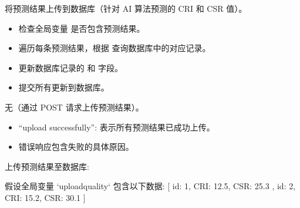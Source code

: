 \documentclass[a4paper,12pt,english]{sphinxmanual}
\begin{document}

\begin{fulllineitems}
\label{\detokenize{api/login:login.uploadQualityResult}}
\pysigstartsignatures
{}
\pysigstopsignatures
\sphinxAtStartPar
将预测结果上传到数据库（针对 AI 算法预测的 CRI 和 CSR 值）。
\begin{description}
\begin{itemize}
\item {} 
\sphinxAtStartPar
检查全局变量  是否包含预测结果。

\item {} 
\sphinxAtStartPar
遍历每条预测结果，根据  查询数据库中的对应记录。

\item {} 
\sphinxAtStartPar
更新数据库记录的  和  字段。

\item {} 
\sphinxAtStartPar
提交所有更新到数据库。

\end{itemize}

\sphinxAtStartPar
无（通过 POST 请求上传预测结果）。

\begin{description}
\begin{itemize}
\item {} 
\sphinxAtStartPar
“upload successfully”: 表示所有预测结果已成功上传。

\item {} 
\sphinxAtStartPar
错误响应包含失败的具体原因。

\end{itemize}

\end{description}

\sphinxAtStartPar
上传预测结果至数据库:

\begin{sphinxVerbatim}[commandchars=\\\{\}]
假设全局变量 `upload\PYGZus{}quality` 包含以下数据:
[
    \PYGZob{}
        \PYGZdq{}id\PYGZdq{}: 1,
        \PYGZdq{}CRI\PYGZdq{}: 12.5,
        \PYGZdq{}CSR\PYGZdq{}: 25.3
    \PYGZcb{},
    \PYGZob{}
        \PYGZdq{}id\PYGZdq{}: 2,
        \PYGZdq{}CRI\PYGZdq{}: 15.2,
        \PYGZdq{}CSR\PYGZdq{}: 30.1
    \PYGZcb{}
]


\end{sphinxVerbatim}
\end{description}
\end{fulllineitems}
\end{document}
